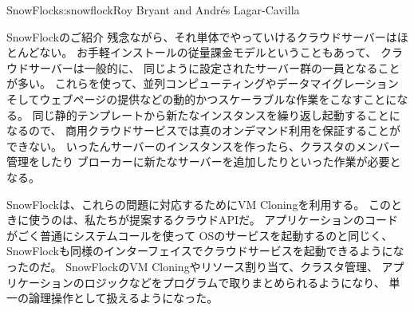 \begin{aosachapter}{SnowFlock}{s:snowflock}{Roy Bryant and Andr\'e{s} Lagar-Cavilla}
\begin{aosasect1}{SnowFlockのご紹介}
残念ながら、それ単体でやっていけるクラウドサーバーはほとんどない。
お手軽インストールの従量課金モデルということもあって、
クラウドサーバーは一般的に、
同じように設定されたサーバー群の一員となることが多い。
これらを使って、並列コンピューティングやデータマイグレーション
そしてウェブページの提供などの動的かつスケーラブルな作業をこなすことになる。
同じ静的テンプレートから新たなインスタンスを繰り返し起動することになるので、
商用クラウドサービスでは真のオンデマンド利用を保証することができない。
いったんサーバーのインスタンスを作ったら、クラスタのメンバー管理をしたり
ブローカーに新たなサーバーを追加したりといった作業が必要となる。

SnowFlockは、これらの問題に対応するためにVM Cloningを利用する。
このときに使うのは、私たちが提案するクラウドAPIだ。
アプリケーションのコードがごく普通にシステムコールを使って
OSのサービスを起動するのと同じく、
SnowFlockも同様のインターフェイスでクラウドサービスを起動できるようになったのだ。
SnowFlockのVM Cloningやリソース割り当て、クラスタ管理、
アプリケーションのロジックなどをプログラムで取りまとめられるようになり、
単一の論理操作として扱えるようになった。


\end{aosasect1}
\end{aosachapter}
